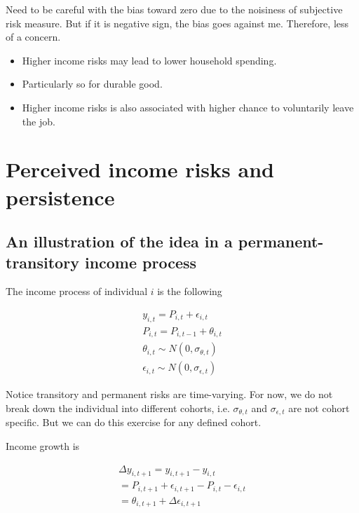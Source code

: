 \documentclass[12pt,notitlepage,onecolumn,aps,pra]{revtex4-1}
\providecommand{\tightlist}{%
      \setlength{\itemsep}{0pt}\setlength{\parskip}{0pt}}
\begin{document}
Need to be careful with the bias toward zero due to the noisiness of
subjective risk measure. But if it is negative sign, the bias goes
against me. Therefore, less of a concern.

\begin{itemize}
\tightlist
\item
  Higher income risks may lead to lower household spending.
\item
  Particularly so for durable good.
\item
  Higher income risks is also associated with higher chance to
  voluntarily leave the job.
\end{itemize}

    \hypertarget{perceived-income-risks-and-persistence}{%
\section{Perceived income risks and
persistence}\label{perceived-income-risks-and-persistence}}

\hypertarget{an-illustration-of-the-idea-in-a-permanent-transitory-income-process}{%
\subsection{An illustration of the idea in a permanent-transitory income
process}\label{an-illustration-of-the-idea-in-a-permanent-transitory-income-process}}

The income process of individual \(i\) is the following

\begin{equation}
\begin{split}
y_{i,t} = P_{i,t} + \epsilon_{i,t} \\
P_{i,t} = P_{i,t-1} + \theta_{i,t} \\
\theta_{i,t} \sim N(0,\sigma_{\theta,t}) \\
\epsilon_{i,t} \sim N(0,\sigma_{\epsilon,t})
\end{split}
\end{equation}

Notice transitory and permanent risks are time-varying. For now, we do
not break down the individual into different cohorts, i.e.
\(\sigma_{\theta,t}\) and \(\sigma_{\epsilon,t}\) are not cohort
specific. But we can do this exercise for any defined cohort.

Income growth is

\begin{equation}
\begin{split}
\Delta y_{i,t+1} = y_{i,t+1} - y_{i,t} \\
 = P_{i,t+1} + \epsilon_{i,t+1} - P_{i,t} - \epsilon_{i,t} \\
 = \theta_{i,t+1} + \Delta \epsilon_{i,t+1}
\end{split}
\end{equation}
\end{document}
